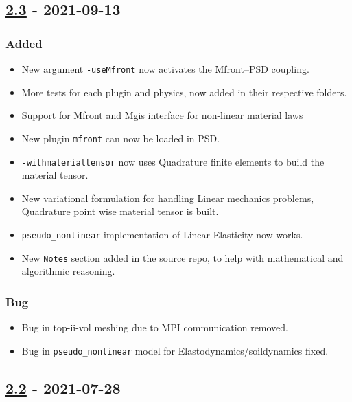 \subsection{\texorpdfstring{\href{https://gitlab.com/PsdSolver/psd_sources/-/tree/v2.3}{2.3}
- 2021-09-13}{2.3 - 2021-09-13}}

\subsubsection{Added}

\begin{itemize}
\tightlist
\item
  New argument \lstinline!-useMfront! now activates the Mfront--PSD
  coupling.
\item
  More tests for each plugin and physics, now added in their respective
  folders.
\item
  Support for Mfront and Mgis interface for non-linear material laws
\item
  New plugin \lstinline!mfront! can now be loaded in PSD.
\item
  \lstinline!-withmaterialtensor! now uses Quadrature finite elements to
  build the material tensor.
\item
  New variational formulation for handling Linear mechanics problems,
  Quadrature point wise material tensor is built.
\item
  \lstinline!pseudo_nonlinear! implementation of Linear Elasticity now
  works.
\item
  New \lstinline!Notes! section added in the source repo, to help with
  mathematical and algorithmic reasoning.
\end{itemize}

\subsubsection{Bug}

\begin{itemize}
\tightlist
\item
  Bug in top-ii-vol meshing due to MPI communication removed.
\item
  Bug in \lstinline!pseudo_nonlinear! model for
  Elastodynamics/soildynamics fixed.
\end{itemize}

\subsection{\texorpdfstring{\href{https://gitlab.com/PsdSolver/psd_sources/-/tree/v2.2}{2.2}
- 2021-07-28}{2.2 - 2021-07-28}}

